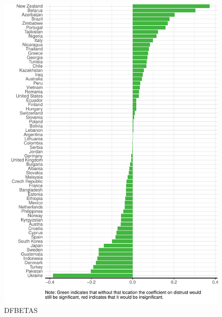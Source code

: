 \documentclass[
  11pt,
]{article}
\begin{document}
\begin{figure}
\includegraphics[width=0.8\linewidth]{write_up_test_files/figure-latex/dfbetas-1} \caption{DFBETAS}\label{fig:dfbetas}
\end{figure}
\end{document}
